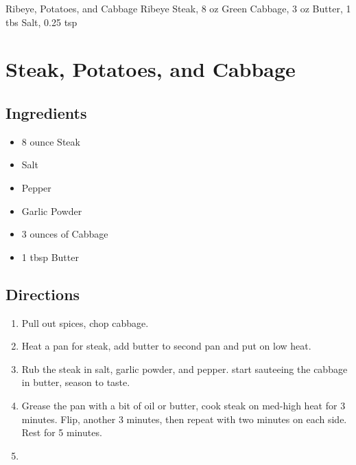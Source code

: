Ribeye, Potatoes, and Cabbage
  Ribeye Steak, 8 oz
  Green Cabbage, 3 oz
  Butter, 1 tbs
  Salt, 0.25 tsp

\section{ Steak, Potatoes, and Cabbage }

\subsection{ Ingredients }

\begin{itemize}
  \item 8 ounce Steak
  \item Salt
  \item Pepper
  \item Garlic Powder
  \item 3 ounces of Cabbage
  \item 1 tbsp Butter
\end{itemize}

\subsection{ Directions }

\begin{enumerate}
  \item Pull out spices, chop cabbage. 
  \item Heat a pan for steak, add butter to second pan and put on low heat. 
  \item Rub the steak in salt, garlic powder, and pepper. start sauteeing the cabbage in butter, season to taste. 
  \item Grease the pan with a bit of oil or butter, cook steak on med-high heat for 3 minutes. Flip, another 3 minutes, then repeat with two minutes on each side. Rest for 5 minutes. 
  \item 
\end{enumerate}

